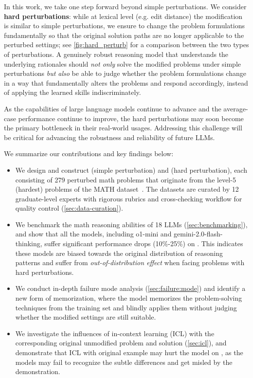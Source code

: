 In this work, we take one step forward beyond simple perturbations. We consider \textbf{hard perturbations}: while at lexical level (e.g. edit distance) the modification is similar to simple perturbations, we ensure to change the problem formulations fundamentally so that the original solution paths are no longer applicable to the perturbed settings; see \cref{fig:hard_perturb} for a comparison between the two types of perturbations. 
A genuinely robust reasoning model that understands the underlying rationales should \textit{not only} solve the modified problems under simple perturbations \textit{but also} be able to judge whether the problem formulations change in a way that fundamentally alters the problems and respond accordingly, instead of applying the learned skills indiscriminately.




As the capabilities of large language models continue to advance and the average-case performance continue to improve, the  hard perturbations may soon become the primary bottleneck in their real-world usages. Addressing this challenge will be critical for advancing the robustness and reliability of future LLMs.

We summarize our contributions and key findings below:
\begin{itemize}[itemsep=1pt, parsep=1pt, topsep=1pt]
    \item We design and construct \SAME (simple perturbation) and \HARD (hard perturbation), each consisting of 279 perturbed math problems that originate from the level-5 (hardest) problems of the MATH dataset~\citep{hendrycksmath2021}.  The datasets are curated by 12 graduate-level experts with rigorous rubrics and cross-checking workflow for quality control (\cref{sec:data-curation}).
    \item We benchmark the math reasoning abilities of 18 LLMs (\cref{sec:benchmarking}), and show that all the models, including o1-mini and gemini-2.0-flash-thinking, suffer significant performance drops {(10\%-25\%)} on \HARD. This indicates these models are biased towards the original distribution of reasoning patterns and suffer from \textit{out-of-distribution effect} when facing problems with hard perturbations. 
    \item We conduct in-depth failure mode analysis (\cref{sec:failure:mode}) and identify a new form of memorization, where the model memorizes the problem-solving techniques from the training set and blindly applies them without judging whether the modified settings are still suitable.
    \item We investigate the influences of in-context learning (ICL) with the corresponding original unmodified problem and solution (\cref{sec:icl}), and demonstrate that ICL with original example may hurt the model on \HARD, as the models may fail to recognize the subtle differences and get misled by the demonstration.
\end{itemize}





